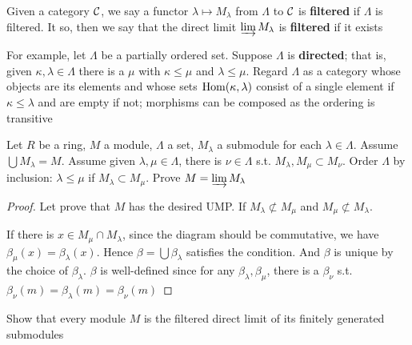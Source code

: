 \documentclass[11pt]{article}
\begin{document}
Given a category \(\mathcal{C}\), we say a functor \(\lambda\mapsto M_\lambda\)
from \(\Lambda\) to \(\mathcal{C}\) is \textbf{filtered} if \(\Lambda\) is filtered. It so, then we say that the
direct limit \(\varinjlim M_\lambda\) is \textbf{filtered} if it exists

For example, let \(\Lambda\) be a partially ordered set. Suppose \(\Lambda\) is \textbf{directed}; that
is, given \(\kappa,\lambda\in\Lambda\) there is a \(\mu\) with \(\kappa\le\mu\) and
\(\lambda\le\mu\). Regard \(\Lambda\) as a category whose objects are its elements and
whose sets \(\operatorname{Hom}(\kappa,\lambda)\) consist of a single element if \(\kappa\le\lambda\)
and are empty if not; morphisms can be composed as the ordering is transitive

\begin{exercise}
\label{7.2}
Let \(R\) be a ring, \(M\) a module, \(\Lambda\) a set, \(M_\lambda\) a submodule for
each \(\lambda\in\Lambda\). Assume \(\bigcup M_\lambda=M\). Assume given
\(\lambda,\mu\in\Lambda\), there is \(\nu\in\Lambda\) s.t. \(M_\lambda,M_\mu\subset
   M_\nu\). Order \(\Lambda\) by inclusion: \(\lambda\le\mu\) if \(M_\lambda\subset
   M_\mu\). Prove \(M=\varinjlim M_\lambda\)
\end{exercise}

\begin{proof}
Let prove that \(M\) has the desired UMP.
If \(M_\lambda\not\subset M_\mu\) and
\(M_\mu\not\subset M_\lambda\).
\begin{center}
\end{center}
If there is \(x\in M_\mu\cap M_\lambda\), since the diagram should be
commutative, we have \(\beta_\mu(x)=\beta_\lambda(x)\). Hence
\(\beta=\bigcup\beta_\lambda\) satisfies the condition. And \(\beta\) is unique by
the choice of \(\beta_\lambda\). \(\beta\) is well-defined since for any
\(\beta_\lambda,\beta_\mu\), there is a \(\beta_\nu\) s.t.
\(\beta_\nu(m)=\beta_\lambda(
   m)=\beta_\nu(m)\)
\end{proof}

\begin{exercise}
\label{7.3}
Show that every module \(M\) is the filtered direct limit of its finitely
generated submodules
\end{exercise}
\end{document}

